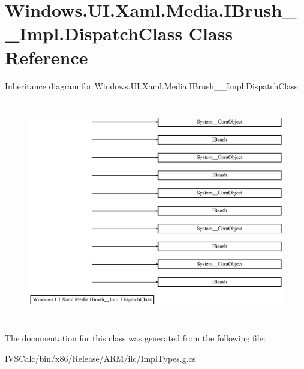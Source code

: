 \hypertarget{class_windows_1_1_u_i_1_1_xaml_1_1_media_1_1_i_brush_____impl_1_1_dispatch_class}{}\section{Windows.\+U\+I.\+Xaml.\+Media.\+I\+Brush\+\_\+\+\_\+\+Impl.\+Dispatch\+Class Class Reference}
\label{class_windows_1_1_u_i_1_1_xaml_1_1_media_1_1_i_brush_____impl_1_1_dispatch_class}
Inheritance diagram for Windows.\+U\+I.\+Xaml.\+Media.\+I\+Brush\+\_\+\+\_\+\+Impl.\+Dispatch\+Class\+:\begin{figure}[H]
\begin{center}
\leavevmode
\includegraphics[height=9.746835cm]{class_windows_1_1_u_i_1_1_xaml_1_1_media_1_1_i_brush_____impl_1_1_dispatch_class}
\end{center}
\end{figure}


The documentation for this class was generated from the following file\+:\begin{DoxyCompactItemize}
\item 
I\+V\+S\+Calc/bin/x86/\+Release/\+A\+R\+M/ilc/Impl\+Types.\+g.\+cs\end{DoxyCompactItemize}
